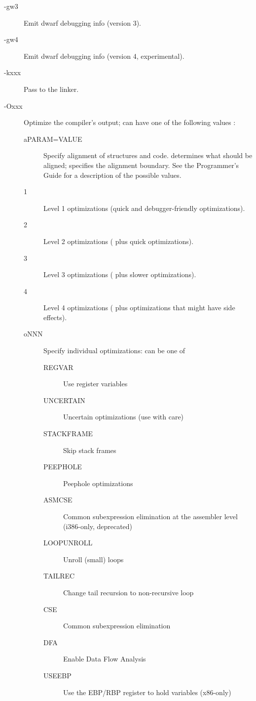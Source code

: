\begin{description}
\item [-gw3] Emit dwarf debugging info (version 3).
\item [-gw4] Emit dwarf debugging info (version 4, experimental).
\item[-kxxx] Pass  to the linker.
\item[-Oxxx]  Optimize the compiler's output;  can have one
of the following values :
\begin{description}
\item[aPARAM=VALUE] Specify alignment of structures and code. 
determines what should be aligned;  specifies the alignment
boundary. See the Programmer's Guide for a description of the possible
values.
\item[1] Level 1 optimizations (quick and debugger-friendly optimizations).
\item[2] Level 2 optimizations ( plus quick optimizations).
\item[3] Level 3 optimizations ( plus slower optimizations).
\item[4] Level 4 optimizations ( plus optimizations that might have side effects).
\item[oNNN] Specify individual optimizations:  can be one of
\begin{description}
\item[REGVAR] Use register variables
\item[UNCERTAIN] Uncertain optimizations (use with care)
\item[STACKFRAME] Skip stack frames
\item[PEEPHOLE] Peephole optimizations
\item[ASMCSE] Common subexpression elimination at the assembler level (i386-only, deprecated)
\item[LOOPUNROLL] Unroll (small) loops
\item[TAILREC] Change tail recursion to non-recursive loop
\item[CSE] Common subexpression elimination
\item[DFA] Enable Data Flow Analysis
\item[USEEBP] Use the EBP/RBP register to hold variables (x86-only)

\end{description}
\end{description}
\end{description}
